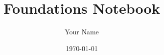 \documentclass[11pt]{report}
\begin{document}
\title{Foundations Notebook}
\author{Your Name}
\date{\today}
\maketitle
\tableofcontents
\newpage


\newpage

\newpage



\end{document}
